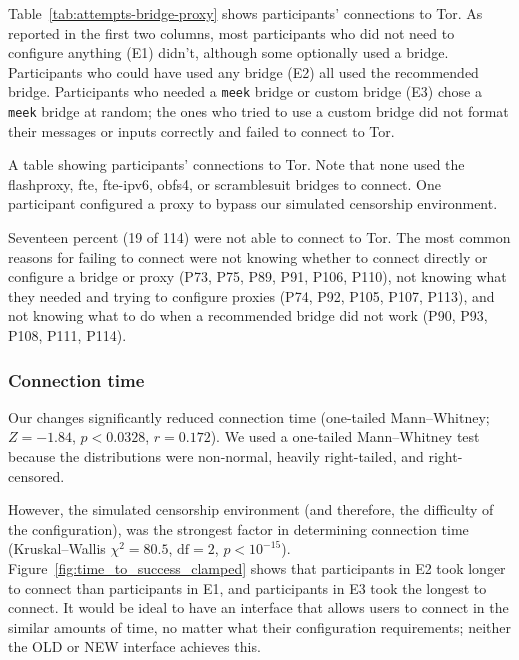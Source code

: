 \documentclass[USenglish,oneside,twocolumn]{article}
\begin{document}
Table~\ref{tab:attempts-bridge-proxy} shows participants' connections to Tor. As reported in the first two columns, most participants who did not need to configure anything (E1) didn't, although some optionally used a bridge. Participants who could have used any bridge (E2) all used the recommended bridge. Participants who needed a \texttt{meek} bridge or custom bridge (E3) chose a \texttt{meek} bridge at random; the ones who tried to use a custom bridge did not format their messages or inputs correctly and failed to connect to Tor.

\begin{table}[t]
\centering

\caption{
A table showing participants' connections to Tor.
Note that none used the flashproxy, fte, fte-ipv6, obfs4, or scramblesuit bridges to connect. 
One participant configured a proxy to bypass our simulated censorship environment.
}
\label{tab:attempts-bridge-proxy}
\end{table} 

Seventeen percent (19 of 114) were not able to connect to Tor. The most common reasons for failing to connect were not knowing whether to connect directly or configure a bridge or proxy (P73, P75, P89, P91, P106, P110), not knowing what they needed and trying to configure proxies (P74, P92, P105, P107, P113), and not knowing what to do when a recommended bridge did not work (P90, P93, P108, P111, P114). 



\subsubsection{Connection time} 
Our changes significantly reduced connection time (one-tailed Mann--Whitney; $ Z = -1.84$, $p < 0.0328$, $r= 0.172$). We used a one-tailed Mann--Whitney test because the distributions were non-normal, heavily right-tailed, and right-censored. 

However, the simulated censorship environment (and therefore, the difficulty of the configuration), was the strongest factor in determining connection time (Kruskal--Wallis $\chi^2 = 80.5$, $\mbox{df} = 2$, $p < 10^{-15}$). Figure~\ref{fig:time_to_success_clamped} shows that participants in E2 took longer to connect than participants in E1, and participants in E3 took the longest to connect. It would be ideal to have an interface that allows users to connect in the similar amounts of time, no matter what their configuration requirements; neither the OLD or NEW interface achieves this. 
\end{document}
